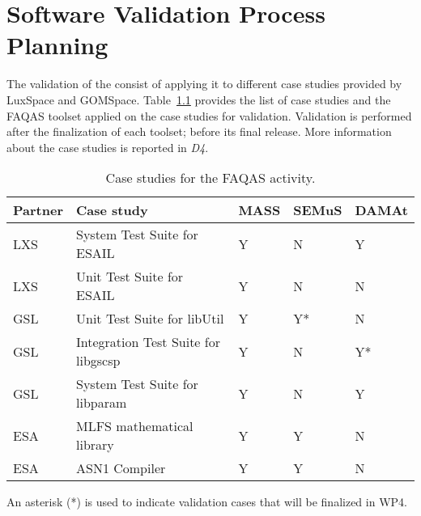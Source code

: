
\chapter{Software Validation Process Planning}



The validation of the \FAQAS consist of applying it to different case studies provided by LuxSpace and GOMSpace.
Table~\ref{tab:caseStudies} provides the list of case studies and the FAQAS toolset applied on the case studies for validation. Validation is performed after the finalization of each toolset; before its final release. More information about the case studies is reported in \emph{D4}.

\begin{table}[htp]
\caption{Case studies for the FAQAS activity.}
\label{tab:caseStudies}
\begin{center}
\begin{tabular}{|p{1.2cm}|p{6cm}|p{1.5cm}|p{1.5cm}|p{1.5cm}|}
\hline
\textbf{Partner}&\textbf{Case study}&\textbf{MASS}&\textbf{SEMuS}&\textbf{DAMAt}\\
\hline
LXS&System Test Suite for ESAIL&Y&N&Y\\
LXS&Unit Test Suite for ESAIL&Y&N&N\\
GSL&Unit Test Suite for libUtil&Y&Y*&N\\
GSL&Integration Test Suite for libgscsp&Y&N&Y*\\
GSL&System Test Suite for libparam&Y&N&Y\\
ESA&MLFS mathematical library&Y&Y&N\\
ESA&ASN1 Compiler&Y&Y&N\\
\hline
\end{tabular}
\end{center}
An asterisk (*) is used to indicate validation cases that will be finalized in WP4.
\end{table}

\clearpage
